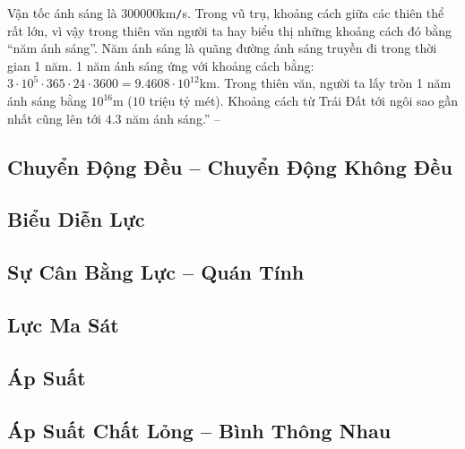 \documentclass{article}
\numberwithin{equation}{section}
\begin{document}
Vận tốc ánh sáng là $300000$km\texttt{/}s. Trong vũ trụ, khoảng cách giữa các thiên thể rất lớn, vì vậy trong thiên văn người ta hay biểu thị những khoảng cách đó bằng ``năm ánh sáng''. Năm ánh sáng là quãng đường ánh sáng truyền đi trong thời gian 1 năm. 1 năm ánh sáng ứng với khoảng cách bằng: $3\cdot 10^5\cdot 365\cdot 24\cdot 3600 = 9.4608\cdot 10^{12}$km. Trong thiên văn, người ta lấy tròn 1 năm ánh sáng bằng $10^{16}$m ($10$ triệu tỷ mét). Khoảng cách từ Trái Đất tới ngôi sao gần nhất cũng lên tới $4.3$ năm ánh sáng.'' -- \cite[p. 10]{SGK_Vat_Ly_8}


\subsection{Chuyển Động Đều -- Chuyển Động Không Đều}


\subsection{Biểu Diễn Lực}


\subsection{Sự Cân Bằng Lực -- Quán Tính}


\subsection{Lực Ma Sát}


\subsection{Áp Suất}


\subsection{Áp Suất Chất Lỏng -- Bình Thông Nhau}
\end{document}

